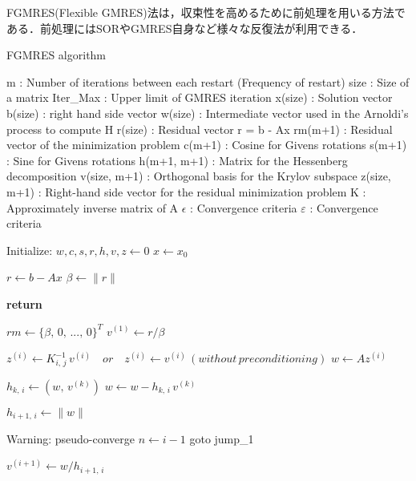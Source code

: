 FGMRES(Flexible GMRES)法は，収束性を高めるために前処理を用いる方法である．前処理にはSORやGMRES自身など様々な反復法が利用できる．



%
\begin{algorithm}
\caption{FGMRES algorithm}
\label{algo:fgmres}

\begin{algorithmic}
\State m             : Number of iterations between each restart (Frequency of restart)
\State size          : Size of a matrix
\State Iter\_Max     : Upper limit of GMRES iteration
\State x(size)       : Solution vector
\State b(size)       : right hand side vector
\State w(size)       : Intermediate vector used in the Arnoldi's process to compute H
\State r(size)       : Residual vector r = b - Ax
\State rm(m+1)       : Residual vector of the minimization problem
\State c(m+1)        : Cosine for Givens rotations
\State s(m+1)        : Sine for Givens rotations
\State h(m+1, m+1)   : Matrix for the Hessenberg decomposition
\State v(size, m+1)  : Orthogonal basis for the Krylov subspace
\State z(size, m+1)  : Right-hand side vector for the residual minimization problem
\State K             : Approximately inverse matrix of A
\State $\epsilon$    : Convergence criteria
\State $\varepsilon$ : Convergence criteria
\State 

\State Initialize: $w,c,s,r,h,v,z \gets 0$
\State $x \gets x_0$
\State


\State $r \gets b - Ax$
\State $\beta \gets \|r\|$

\State \bf{return}
\EndIf

\State $rm \gets \{\beta,\,0,\,...,\,0\}^T$
\State $v^{(1)} \gets r / \beta$
\State

\State $z^{(i)} \gets K^{-1}_{i,\,j}\, v^{(i)} \quad or \quad z^{(i)} \gets v^{(i)}\,(without\, preconditioning)$
\State $w \gets A z^{(i)}$

\State $h_{k,\,i} \gets (w,\,v^{(k)})$
\State $w \gets w - h_{k,\,i}\,v^{(k)}$
\EndFor

\State $h_{i+1,\,i} \gets \|w\|$
\State

\State Warning: pseudo-converge
\State $n \gets i-1$
\State goto jump\_1
\EndIf
\State

\State $v^{(i+1)} \gets w / h_{i+1,\,i}$

\end{algorithmic}

\end{algorithm}

